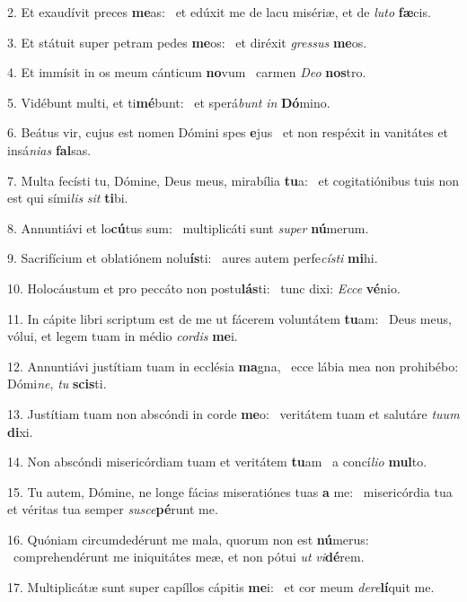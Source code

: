 2. Et exaudívit preces \textbf{me}as: \ast\  et edúxit me de lacu misériæ, et de \textit{lu}\textit{to} \textbf{fæ}cis.\

3. Et státuit super petram pedes \textbf{me}os: \ast\  et diréxit \textit{gres}\textit{sus} \textbf{me}os.\

4. Et immísit in os meum cánticum \textbf{no}vum \ast\  carmen \textit{De}\textit{o} \textbf{nos}tro.\

5. Vidébunt multi, et ti\textbf{mé}bunt: \ast\  et sperá\textit{bunt} \textit{in} \textbf{Dó}mino.\

6. Beátus vir, cujus est nomen Dómini spes \textbf{e}jus \ast\  et non respéxit in vanitátes et insá\textit{ni}\textit{as} \textbf{fal}sas.\

7. Multa fecísti tu, Dómine, Deus meus, mirabília \textbf{tu}a: \ast\  et cogitatiónibus tuis non est qui sími\textit{lis} \textit{sit} \textbf{ti}bi.\

8. Annuntiávi et lo\textbf{cú}tus sum: \ast\  multiplicáti sunt \textit{su}\textit{per} \textbf{nú}merum.\

9. Sacrifícium et oblatiónem nolu\textbf{ís}ti: \ast\  aures autem perfe\textit{cís}\textit{ti} \textbf{mi}hi.\

10. Holocáustum et pro peccáto non postu\textbf{lás}ti: \ast\  tunc dixi: \textit{Ec}\textit{ce} \textbf{vé}nio.\

11. In cápite libri scriptum est de me ut fácerem voluntátem \textbf{tu}am: \ast\  Deus meus, vólui, et legem tuam in médio \textit{cor}\textit{dis} \textbf{me}i.\

12. Annuntiávi justítiam tuam in ecclésia \textbf{ma}gna, \ast\  ecce lábia mea non prohibébo: Dómi\textit{ne}, \textit{tu} \textbf{scis}ti.\

13. Justítiam tuam non abscóndi in corde \textbf{me}o: \ast\  veritátem tuam et salutáre \textit{tu}\textit{um} \textbf{di}xi.\

14. Non abscóndi misericórdiam tuam et veritátem \textbf{tu}am \ast\  a concí\textit{li}\textit{o} \textbf{mul}to.\

15. Tu autem, Dómine, ne longe fácias miseratiónes tuas \textbf{a} me: \ast\  misericórdia tua et véritas tua semper \textit{su}\textit{sce}\textbf{pé}runt me.\

16. Quóniam circumdedérunt me mala, quorum non est \textbf{nú}merus: \ast\  comprehendérunt me iniquitátes meæ, et non pótui \textit{ut} \textit{vi}\textbf{dé}rem.\

17. Multiplicátæ sunt super capíllos cápitis \textbf{me}i: \ast\  et cor meum \textit{de}\textit{re}\textbf{lí}quit me.\

